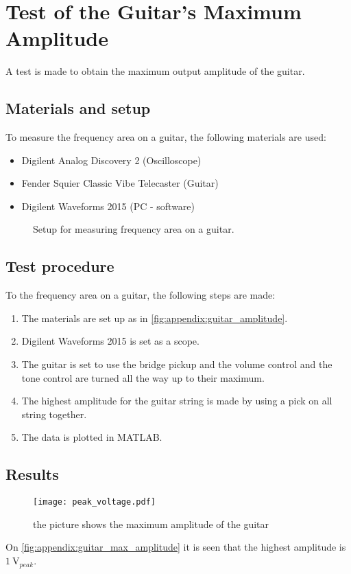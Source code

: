 \chapter{Test of the Guitar's Maximum Amplitude}\label{app:guitar_max_amplitude}

A test is made to obtain the maximum output amplitude of the guitar.

\section*{Materials and setup}
To measure the frequency area on a guitar, the following materials are used:
\begin{itemize}
\item Digilent Analog Discovery 2 (Oscilloscope)
\item Fender Squier Classic Vibe Telecaster (Guitar)
\item Digilent Waveforms 2015 (PC - software)
\end{itemize}

\begin{figure}[htbp!]
\centering
\def\svgwidth{\columnwidth}

\caption{Setup for measuring frequency area on a guitar.}
		\label{fig:appendix:guitar_amplitude}
\end{figure}

\section*{Test procedure}
To the frequency area on a guitar, the following steps are made:
\begin{enumerate}
\item The materials are set up as in \autoref{fig:appendix:guitar_amplitude}.
\item Digilent Waveforms 2015 is set as a scope. 
\item The guitar is set to use the bridge pickup and the volume control and the tone control are turned all the way up to their maximum.
\item The highest amplitude for the guitar string is made by using a pick on all string together.
\item The data is plotted in MATLAB.
\end{enumerate}

\section*{Results}

\begin{figure}[htbp!]
	\centering
		\texttt{[image: peak\_voltage.pdf]}
		\caption{the picture shows the maximum amplitude of the guitar}
		\label{fig:appendix:guitar_max_amplitude}
\end{figure}

On  \autoref{fig:appendix:guitar_max_amplitude} it is seen that the highest amplitude is $\SI{1}{\volt}_{peak}$.
